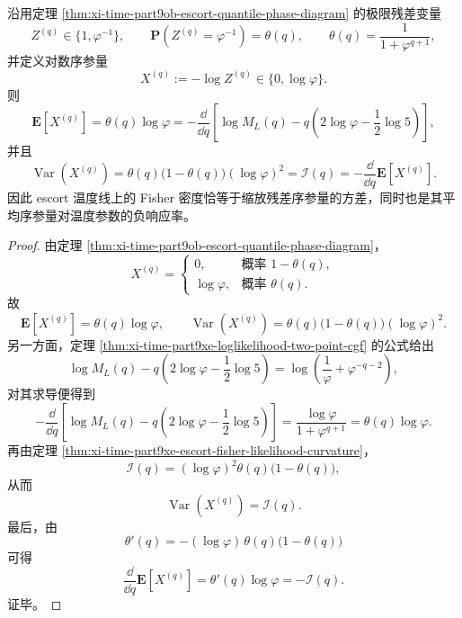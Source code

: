 \begin{corollary}\label{cor:xi-time-part9xe-escort-fluctuation-response}
沿用定理 \ref{thm:xi-time-part9ob-escort-quantile-phase-diagram} 的极限残差变量
\[
Z^{(q)}\in\{1,\varphi^{-1}\},
\qquad
\mathbf P\!\left(Z^{(q)}=\varphi^{-1}\right)=\theta(q),
\qquad
\theta(q)=\frac{1}{1+\varphi^{q+1}},
\]
并定义对数序参量
\[
X^{(q)}:=-\log Z^{(q)}\in\{0,\log\varphi\}.
\]
则
\[
\mathbf E\!\left[X^{(q)}\right]
=
\theta(q)\log\varphi
=
-\frac{\dd}{\dd q}
\left[
\log M_L(q)-q\left(2\log\varphi-\frac12\log 5\right)
\right],
\]
并且
\[
\operatorname{Var}\!\left(X^{(q)}\right)
=
\theta(q)\bigl(1-\theta(q)\bigr)(\log\varphi)^2
=
\mathcal I(q)
=
-\frac{\dd}{\dd q}\mathbf E\!\left[X^{(q)}\right].
\]
因此 escort 温度线上的 Fisher 密度恰等于缩放残差序参量的方差，同时也是其平均序参量对温度参数的负响应率。
\end{corollary}
\begin{proof}
由定理 \ref{thm:xi-time-part9ob-escort-quantile-phase-diagram}，
\[
X^{(q)}=
\begin{cases}
0,& \text{概率 }1-\theta(q),\\
\log\varphi,& \text{概率 }\theta(q).
\end{cases}
\]
故
\[
\mathbf E\!\left[X^{(q)}\right]=\theta(q)\log\varphi,
\qquad
\operatorname{Var}\!\left(X^{(q)}\right)
=
\theta(q)\bigl(1-\theta(q)\bigr)(\log\varphi)^2.
\]
另一方面，定理 \ref{thm:xi-time-part9xe-loglikelihood-two-point-cgf} 的公式给出
\[
\log M_L(q)-q\left(2\log\varphi-\frac12\log 5\right)
=
\log\!\left(\frac1\varphi+\varphi^{-q-2}\right),
\]
对其求导便得到
\[
-\frac{\dd}{\dd q}
\left[
\log M_L(q)-q\left(2\log\varphi-\frac12\log 5\right)
\right]
=
\frac{\log\varphi}{1+\varphi^{q+1}}
=
\theta(q)\log\varphi.
\]
再由定理 \ref{thm:xi-time-part9xe-escort-fisher-likelihood-curvature}，
\[
\mathcal I(q)
=
(\log\varphi)^2\theta(q)\bigl(1-\theta(q)\bigr),
\]
从而
\[
\operatorname{Var}\!\left(X^{(q)}\right)=\mathcal I(q).
\]
最后，由
\[
\theta'(q)=-(\log\varphi)\,\theta(q)\bigl(1-\theta(q)\bigr)
\]
可得
\[
\frac{\dd}{\dd q}\mathbf E\!\left[X^{(q)}\right]
=
\theta'(q)\log\varphi
=
-\mathcal I(q).
\]
证毕。
\end{proof}

